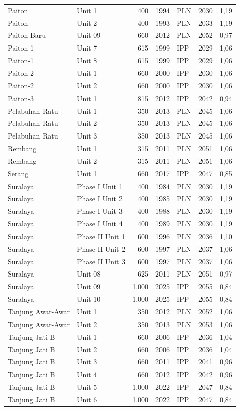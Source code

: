 \begin{longtable}{p{} p{} r r l r r}
Paiton & Unit 1 & 400 & 1994 & PLN & 2030 & 1,19 \\
Paiton & Unit 2 & 400 & 1993 & PLN & 2033 & 1,19 \\
Paiton Baru & Unit 09 & 660 & 2012 & PLN & 2052 & 0,97 \\
Paiton-1 & Unit 7 & 615 & 1999 & IPP & 2029 & 1,06 \\
Paiton-1 & Unit 8 & 615 & 1999 & IPP & 2029 & 1,06 \\
Paiton-2 & Unit 1 & 660 & 2000 & IPP & 2030 & 1,06 \\
Paiton-2 & Unit 2 & 660 & 2000 & IPP & 2030 & 1,06 \\
Paiton-3 & Unit 1 & 815 & 2012 & IPP & 2042 & 0,94 \\
Pelabuhan Ratu & Unit 1 & 350 & 2013 & PLN & 2045 & 1,06 \\
Pelabuhan Ratu & Unit 2 & 350 & 2013 & PLN & 2045 & 1,06 \\
Pelabuhan Ratu & Unit 3 & 350 & 2013 & PLN & 2045 & 1,06 \\
Rembang & Unit 1 & 315 & 2011 & PLN & 2051 & 1,06 \\
Rembang & Unit 2 & 315 & 2011 & PLN & 2051 & 1,06 \\
Serang & Unit 1 & 660 & 2017 & IPP & 2047 & 0,85 \\
Suralaya & Phase I Unit 1 & 400 & 1984 & PLN & 2030 & 1,19 \\
Suralaya & Phase I Unit 2 & 400 & 1985 & PLN & 2030 & 1,19 \\
Suralaya & Phase I Unit 3 & 400 & 1988 & PLN & 2030 & 1,19 \\
Suralaya & Phase I Unit 4 & 400 & 1989 & PLN & 2030 & 1,19 \\
Suralaya & Phase II Unit 1 & 600 & 1996 & PLN & 2036 & 1,10 \\
Suralaya & Phase II Unit 2 & 600 & 1997 & PLN & 2037 & 1,06 \\
Suralaya & Phase II Unit 3 & 600 & 1997 & PLN & 2037 & 1,06 \\
Suralaya & Unit 08 & 625 & 2011 & PLN & 2051 & 0,97 \\
Suralaya & Unit 09 & 1.000 & 2025 & IPP & 2055 & 0,84 \\
Suralaya & Unit 10 & 1.000 & 2025 & IPP & 2055 & 0,84 \\
Tanjung Awar-Awar & Unit 1 & 350 & 2012 & PLN & 2052 & 1,06 \\
Tanjung Awar-Awar & Unit 2 & 350 & 2013 & PLN & 2053 & 1,06 \\
Tanjung Jati B & Unit 1 & 660 & 2006 & IPP & 2036 & 1,04 \\
Tanjung Jati B & Unit 2 & 660 & 2006 & IPP & 2036 & 1,04 \\
Tanjung Jati B & Unit 3 & 660 & 2011 & IPP & 2041 & 0,96 \\
Tanjung Jati B & Unit 4 & 660 & 2012 & IPP & 2042 & 0,96 \\
Tanjung Jati B & Unit 5 & 1.000 & 2022 & IPP & 2047 & 0,84 \\
Tanjung Jati B & Unit 6 & 1.000 & 2022 & IPP & 2047 & 0,84 \\
\bottomrule
\end{longtable}
